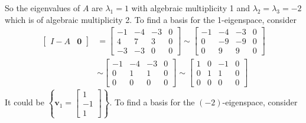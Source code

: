 \documentclass{beamer}
\theoremstyle{definition}
\theoremstyle{remark}
\begin{document}
\begin{frame}[t]
\begin{example}
So the eigenvalues of $A$ are $\lambda_1=1$ with algebraic multiplicity 1 and $\lambda_2=\lambda_3=-2$ which is of algebraic multiplicity 2. To find a basis for the 1-eigenspace, consider
\begin{align*}
\left[\begin{array}{c|c}
I-A&\mathbf0
\end{array}\right]&=\left[\begin{array}{ccc|c}
-1&-4&-3&0\\
4&7&3&0\\
-3&-3&0&0
\end{array}\right]\sim\left[\begin{array}{ccc|c}
-1&-4&-3&0\\
0&-9&-9&0\\
0&9&9&0
\end{array}\right]\\
&\sim\left[\begin{array}{ccc|c}
-1&-4&-3&0\\
0&1&1&0\\
0&0&0&0
\end{array}\right]\sim\left[\begin{array}{ccc|c}
1&0&-1&0\\
0&1&1&0\\
0&0&0&0
\end{array}\right]
\end{align*}
It could be $\left\{\mathbf v_1=\begin{bmatrix}
1\\-1\\1
\end{bmatrix}\right\}$\pause. To find a basis for the $(-2)$-eigenspace, consider
\end{example}
\end{frame}
\end{document}
